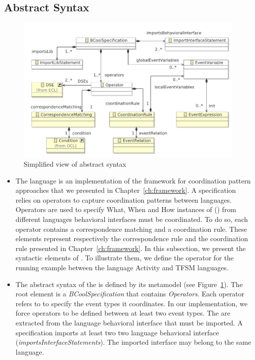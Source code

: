 \subsection{Abstract Syntax}
\begin{figure}
	\center
	\includegraphics[width=.8\textwidth]{bcool/figs/BcoolMM}
	\caption{Simplified view of \bcool abstract syntax}
	\label{fig:bcool}
\end{figure}

\begin{itemize}
	\item The \bcool language is an implementation of the framework for coordination pattern approaches that we presented in Chapter~\ref{ch:framework}. A \bcool specification relies on operators to capture coordination patterns between languages. Operators are used to specify What, When and How instances of \dse (\mse) from different languages behavioral interfaces must be coordinated. To do so, each operator contains a correspondence matching and a coordination rule. These elements represent respectively the correspondence rule and the coordination rule presented in Chapter~\ref{ch:framework}. In this subsection, we present the syntactic elements of \bcool. To illustrate them, we define the operator for the running example between the language Activity and TFSM languages.
	
	\item The abstract syntax of the \bcool is defined by its metamodel (see Figure~\ref{fig:bcool}). The root element is a \emph{BCoolSpecification} that contains \emph{Operators}. Each operator refers to \dse to specify the event types it coordinates. In our implementation, we force operators to be defined between at least two event types. The \dse are extracted from the language behavioral interface that must be imported. A \bcool specification imports at least two  two language behavioral interface (\emph{importsInterfaceStatements}). The imported interface may belong to the same language.    
	
\end{itemize}


